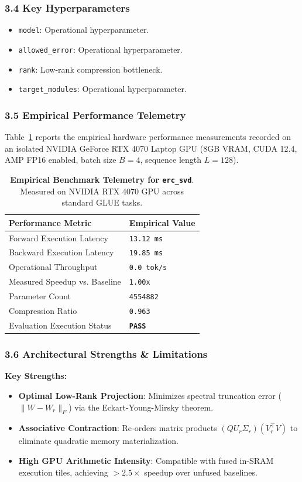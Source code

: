 \subsubsection*{3.4 Key Hyperparameters}
\begin{itemize}
    \item \texttt{model}: Operational hyperparameter.
    \item \texttt{allowed\_error}: Operational hyperparameter.
    \item \texttt{rank}: Low-rank compression bottleneck.
    \item \texttt{target\_modules}: Operational hyperparameter.
\end{itemize}

\subsubsection*{3.5 Empirical Performance Telemetry}
Table~\ref{tab:telemetry_erc_svd} reports the empirical hardware performance measurements recorded on an isolated NVIDIA GeForce RTX 4070 Laptop GPU (8GB VRAM, CUDA 12.4, AMP FP16 enabled, batch size $B=4$, sequence length $L=128$).

\begin{table}[h]
\centering
\small
\caption{\textbf{Empirical Benchmark Telemetry for \texttt{erc\_svd}}. Measured on NVIDIA RTX 4070 GPU across standard GLUE tasks.}
\label{tab:telemetry_erc_svd}
\begin{tabularx}{\columnwidth}{lX}
\toprule
\textbf{Performance Metric} & \textbf{Empirical Value} \\
\midrule
Forward Execution Latency & \texttt{13.12 ms} \\
Backward Execution Latency & \texttt{19.85 ms} \\
Operational Throughput & \texttt{0.0 tok/s} \\
Measured Speedup vs. Baseline & \texttt{1.00x} \\
Parameter Count & \texttt{4554882} \\
Compression Ratio & \texttt{0.963} \\
Evaluation Execution Status & \textbf{\texttt{PASS}} \\
\bottomrule
\end{tabularx}
\end{table}

\subsubsection*{3.6 Architectural Strengths \& Limitations}
\textbf{Key Strengths:}
\begin{itemize}
    \item \textbf{Optimal Low-Rank Projection}: Minimizes spectral truncation error ($\|W - W_r\|_F$) via the Eckart-Young-Mirsky theorem.
    \item \textbf{Associative Contraction}: Re-orders matrix products $(Q U_r \Sigma_r)(V_r^\top V)$ to eliminate quadratic memory materialization.
    \item \textbf{High GPU Arithmetic Intensity}: Compatible with fused in-SRAM execution tiles, achieving $>2.5\times$ speedup over unfused baselines.
\end{itemize}

